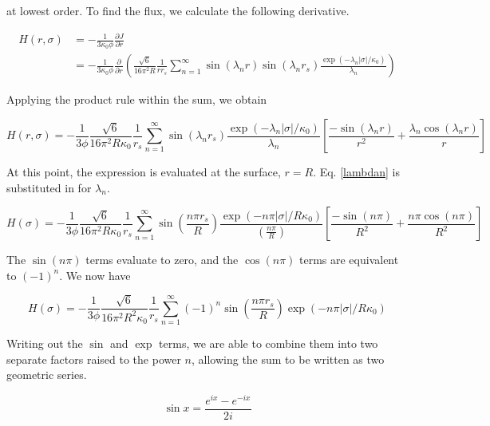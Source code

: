 \documentclass[onecolumn]{aastex63}
\begin{document}
at lowest order. To find the flux, we calculate the following derivative.

\begin{equation}
    \begin{split}
    H(r, \sigma) &= - \frac{1}{3\kappa_0 \phi}\frac{\partial J}{\partial r}\\
    &= - \frac{1}{3\kappa_0 \phi}\frac{\partial}{\partial r}\left(\frac{\sqrt{6}}{16 \pi^2 R} \frac{1}{rr_s} \sum_{n=1}^{\infty}\sin(\lambda_n r) \sin(\lambda_n r_s) \frac{\exp{(-\lambda_n |\sigma|/\kappa_0)}}{\lambda_n}\right)
    \end{split}
\end{equation}

Applying the product rule within the sum, we obtain

\begin{equation}
    H(r, \sigma) = - \frac{1}{3 \phi} \frac{\sqrt{6}}{16 \pi^2 R \kappa_0} \frac{1}{r_s} \sum_{n=1}^{\infty} \sin(\lambda_n r_s) \frac{\exp{(-\lambda_n |\sigma|/\kappa_0)}}{\lambda_n} \left[ \frac{-\sin(\lambda_n r)}{r^2} + \frac{\lambda_n \cos(\lambda_n r)}{r}\right]
\end{equation}

At this point, the expression is evaluated at the surface, $r=R$. Eq. \ref{lambdan} is substituted in for $\lambda_n$.

\begin{equation}
    H(\sigma) = - \frac{1}{3 \phi} \frac{\sqrt{6}}{16 \pi^2 R \kappa_0} \frac{1}{r_s} \sum_{n=1}^{\infty} \sin{\left(\frac{n\pi r_s}{R}\right)} \frac{\exp{(-n \pi |\sigma|/R\kappa_0)}}{\left(\frac{n\pi}{R}\right)} \left[ \frac{-\sin(n \pi)}{R^2} + \frac{n \pi \cos(n \pi)}{R^2}\right]
\end{equation}

The $\sin(n\pi)$ terms evaluate to zero, and the $\cos(n\pi)$ terms are equivalent to $(-1)^n$. We now have

\begin{equation}
    H(\sigma) = - \frac{1}{3 \phi} \frac{\sqrt{6}}{16 \pi^2 R^2 \kappa_0} \frac{1}{r_s} \sum_{n=1}^{\infty} (-1)^n \sin{\left(\frac{n\pi r_s}{R}\right)} \exp{(-n \pi |\sigma|/R\kappa_0)}
\end{equation}

Writing out the $\sin$ and $\exp$ terms, we are able to combine them into two separate factors raised to the power $n$, allowing the sum to be written as two geometric series.

\begin{equation}
    \sin{x} = \frac{e^{ix}-e^{-ix}}{2i}
\end{equation}
\end{document}
